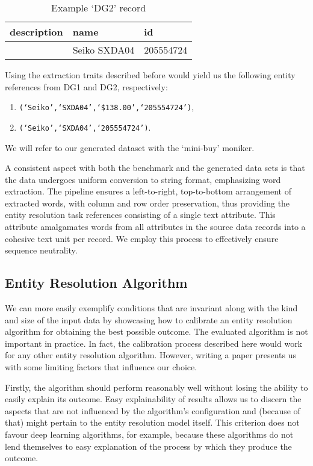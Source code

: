 \begin{table}[ht]
    \setlength\tabcolsep{12pt}
    \centering
    \begin{tabular}[b]{lll}
        \toprule
        description & name         & id        \\
        \midrule
                    & Seiko SXDA04 & 205554724 \\
        \bottomrule
    \end{tabular}
    \caption{Example `DG2' record}\label{tab:dg2-record}
\end{table}

Using the extraction traits described before would yield us the
following entity references from DG1 and DG2, respectively:
\begin{enumerate}
    \item \texttt{(`Seiko',`SXDA04',`\$138.00',`205554724')},
    \item \texttt{(`Seiko',`SXDA04',`205554724')}.
\end{enumerate}

We will refer to our generated dataset with the `mini-buy' moniker.

A consistent aspect with both the benchmark and the generated data sets is that
the data undergoes uniform conversion to string format, emphasizing word
extraction.
The pipeline ensures a left-to-right, top-to-bottom arrangement of extracted
words, with column and row order preservation, thus providing the entity
resolution task references consisting of a single text attribute.
This attribute amalgamates words from all attributes in the source data records
into a cohesive text unit per record.
We employ this process to effectively ensure sequence neutrality.

\subsection{Entity Resolution Algorithm}\label{subsec:Entity Resolution Algorithm}

We can more easily exemplify conditions that are invariant along with the kind
and size of the input data by showcasing how to calibrate an entity resolution
algorithm for obtaining the best possible outcome.
The evaluated algorithm is not important in practice.
In fact, the calibration process described here would work for any other entity
resolution algorithm.
However, writing a paper presents us with some limiting factors that influence
our choice.

Firstly, the algorithm should perform reasonably well without losing the ability
to easily explain its outcome.
Easy explainability of results allows us to discern the aspects that are not
influenced by the algorithm's configuration and (because of that) might pertain
to the entity resolution model itself.
This criterion does not favour deep learning algorithms, for example, because
these algorithms do not lend themselves to easy explanation of the process by
which they produce the outcome.

